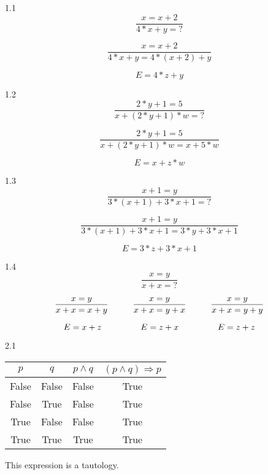 \documentclass{article}
\begin{document}

\pagestyle{fancy}


1.1
\[ \frac{x = x + 2}{4 * x + y = \mathord{?}} \]

\[ \frac{x = x + 2}{4 * x + y = 4 * (x + 2) + y} \]

\[ E = 4 * z + y \]

\vspace{10mm}
1.2
\[ \frac{2 * y + 1 = 5}{x + (2 * y + 1) * w = \mathord{?}} \]

\[ \frac{2 * y + 1 = 5}{x + (2 * y + 1) * w = x + 5 * w} \]

\[ E = x + z * w \]

\vspace{10mm}
1.3
\[ \frac{x + 1 = y}{3 * (x + 1) + 3 * x + 1 = \mathord{?}} \]

\[ \frac{x + 1 = y}{3 * (x + 1) + 3 * x + 1 = 3 * y + 3 * x + 1} \]

\[ E = 3 * z + 3 * x + 1 \]

\vspace{10mm}
1.4
\[ \frac{x = y}{x + x = \mathord{?}} \]

\[ 
    \frac{x = y}{x + x = x + y} \hspace{10mm} 
    \frac{x = y}{x + x = y + x} \hspace{10mm} 
    \frac{x = y}{x + x = y + y}
\]

\[
    E = x + z \hspace{16mm}
    E = z + x \hspace{16mm}
    E = z + z
\]

\newpage

2.1
\begin{center}
    \begin{tabular}{c c|c||c}
         $p$ & $q$ & \( p \land q \) & \( (p \land q) \Longrightarrow p\) \\
         \hline
         False & False & False & True \\
         False & True & False & True \\
         True & False & False & True \\
         True & True & True & True \\
    \end{tabular}
    This expression is a tautology.
\end{center}
\end{document}
